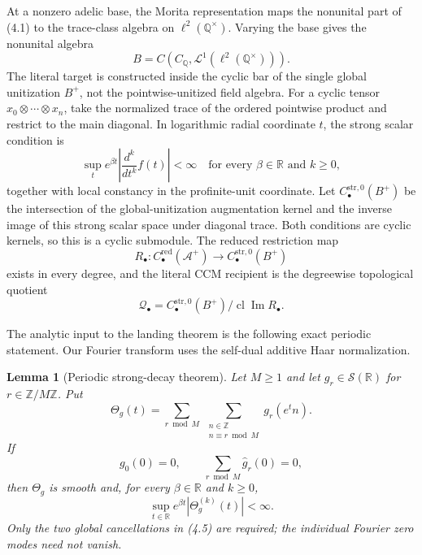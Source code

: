 \documentclass[11pt,reqno]{amsart}
\newtheorem{lemma}[theorem]{Lemma}
\newcommand{\R}{\mathbb R}
\newcommand{\Q}{\mathbb Q}
\newcommand{\Z}{\mathbb Z}
\newcommand{\im}{\operatorname{Im}}
\newcommand{\clos}{\operatorname{cl}}
\newcommand{\cS}{\mathcal S}
\newcommand{\cA}{\mathcal A}
\begin{document}
At a nonzero adelic base, the Morita representation maps the nonunital part of (4.1) to the
trace-class algebra on $\ell^2(\Q^\times)$.  Varying the base gives the nonunital algebra
\[
                  B=C(C_\Q,\mathcal L^1(\ell^2(\Q^\times))).
\]
The literal target is constructed inside the cyclic bar of the single global unitization $B^+$,
not the pointwise-unitized field algebra.  For a cyclic tensor
$x_0\otimes\cdots\otimes x_n$, take the normalized trace of the ordered pointwise product and
restrict to the main diagonal.  In logarithmic radial coordinate $t$, the strong scalar condition is
\[
  \sup_t e^{\beta t}\left|\frac{d^k}{dt^k}f(t)\right|<\infty
  \quad\text{for every }\beta\in\R\text{ and }k\ge0, \tag{4.3}
\]
together with local constancy in the profinite-unit coordinate.  Let
$C_\bullet^{\mathrm{str},0}(B^+)$ be the intersection of the global-unitization augmentation
kernel and the inverse image of this strong scalar space under diagonal trace.  Both conditions
are cyclic kernels, so this is a cyclic submodule.  The reduced restriction map
\[
 R_\bullet:C_\bullet^{\mathrm{red}}(\cA^+)\longrightarrow
                  C_\bullet^{\mathrm{str},0}(B^+)
\]
exists in every degree, and the literal CCM recipient is the degreewise topological quotient
\[
       \mathcal Q_\bullet=C_\bullet^{\mathrm{str},0}(B^+)/
                                     \clos\im R_\bullet.
\]

The analytic input to the landing theorem is the following exact periodic statement.  Our Fourier
transform uses the self-dual additive Haar normalization.

\begin{lemma}[Periodic strong-decay theorem]\label{lem:periodic}
Let $M\ge1$ and let $g_r\in\cS(\R)$ for $r\in\Z/M\Z$.  Put
\[
 \Theta_g(t)=\sum_{r\bmod M}\ \sum_{\substack{n\in\Z\\n\equiv r\bmod M}}
                         g_r(e^t n).                 \tag{4.4}
\]
If
\[
                    g_0(0)=0,\qquad
                    \sum_{r\bmod M}\widehat g_r(0)=0, \tag{4.5}
\]
then $\Theta_g$ is smooth and, for every $\beta\in\R$ and $k\ge0$,
\[
             \sup_{t\in\R}e^{\beta t}|\Theta_g^{(k)}(t)|<\infty. \tag{4.6}
\]
Only the two global cancellations in \textup{(4.5)} are required; the individual Fourier zero
modes need not vanish.
\end{lemma}
\end{document}
